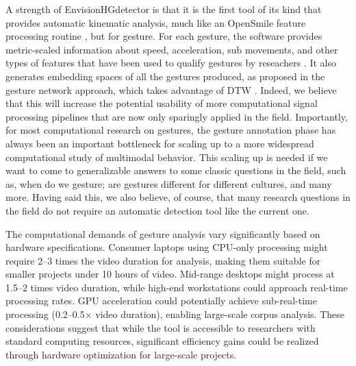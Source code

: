 \documentclass[11pt,smallheadings,cleardoublepage=empty,tocflat,numbers=noenddot,twoside,captions=tableheading]{scrbook}
\begin{document}
\begin{refsection}
A strength of EnvisionHGdetector is that it is the first tool of its kind that provides automatic kinematic analysis, much like an OpenSmile feature processing routine \parencite{eybenOpensmileMunichVersatile2010}, but for gesture. For each gesture, the software provides metric-scaled information about speed, acceleration, sub movements, and other types of features that have been used to qualify gestures by reseachers \parencite{trujilloMarkerlessAutomaticAnalysis2019, trujilloCommunicativeIntentModulates2018, pouwSystematicInvestigationGesture2021}. It also generates embedding spaces of all the gestures produced, as proposed in the gesture network approach, which takes advantage of DTW \parencite{pouwGestureNetworksIntroducing2019}. Indeed, we believe that this will increase the potential usability of more computational signal processing pipelines that are now only sparingly applied in the field. Importantly, for most computational research on gestures, the gesture annotation phase has always been an important bottleneck for scaling up to a more widespread computational study of multimodal behavior. This scaling up is needed if we want to come to generalizable answers to some classic questions in the field, such as, when do we gesture; are gestures different for different cultures, and many more. Having said this, we also believe, of course, that many research questions in the field do not require an automatic detection tool like the current one.

The computational demands of gesture analysis vary significantly based on hardware specifications. Consumer laptops using CPU-only processing might require 2–3 times the video duration for analysis, making them suitable for smaller projects under 10 hours of video. Mid-range desktops might process at 1.5–2 times video duration, while high-end workstations could approach real-time processing rates. GPU acceleration could potentially achieve sub-real-time processing (0.2–0.5× video duration), enabling large-scale corpus analysis. These considerations suggest that while the tool is accessible to researchers with standard computing resources, significant efficiency gains could be realized through hardware optimization for large-scale projects.


\end{refsection}
\end{document}

